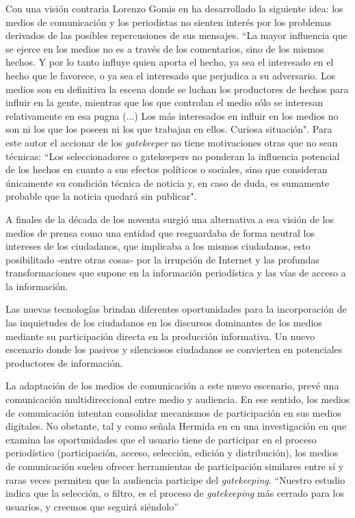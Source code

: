 Con una visión contraria Lorenzo Gomis en \cite{gomis1991teor} ha desarrollado la siguiente idea: los medios de comunicación y los periodistas no sienten interés por los problemas derivados de las posibles repercusiones de sus mensajes. ``La mayor influencia que se ejerce en los medios no es a través de los comentarios, sino de los mismos hechos. Y por lo tanto influye quien aporta el hecho, ya sea el interesado en el hecho que le favorece, o ya sea el interesado que perjudica a su adversario. Los medios son en definitiva la escena donde se luchan los productores de hechos para influir en la gente, mientras que los que controlan el medio sólo se interesan relativamente en esa pugna (...) Los más interesados en influir en los medios no son ni los que los poseen ni los que trabajan en ellos. Curiosa situación".
Para este autor el accionar de los \emph{gatekeeper} no tiene motivaciones otras que no sean técnicas: ``Los seleccionadores o gatekeepers no ponderan la influencia potencial de los hechos en cuanto a sus efectos políticos o sociales, sino que consideran únicamente su condición técnica de noticia y, en caso de duda, es sumamente probable que la noticia quedará sin publicar".

A finales de la década de los noventa surgió una alternativa a esa visión de los medios de prensa como una entidad que resguardaba de forma neutral los intereses de los ciudadanos, que implicaba a los mismos ciudadanos, esto posibilitado -entre otras cosas- por la irrupción de Internet y las profundas transformaciones que supone en la información periodística y las vías de acceso a la información.

Las nuevas tecnologías brindan diferentes oportunidades para la incorporación de las inquietudes de los ciudadanos en los discursos
dominantes de los medios mediante su participación directa en la producción informativa. Un nuevo escenario donde los pasivos y silenciosos ciudadanos se convierten en potenciales productores de información.

La adaptación de los medios de comunicación a este nuevo escenario, prevé una comunicación multidireccional entre medio y audiencia. En ese sentido, los medios de comunicación intentan consolidar mecanismos de participación en sus medios digitales. No obstante, tal y como señala Hermida en \cite{doi17512781003640703} en una investigación en que examina las oportunidades que el usuario tiene de participar en el proceso periodístico (participación, acceso, selección, edición y distribución), los medios de comunicación suelen ofrecer herramientas de participación similares entre sí y raras veces permiten que la audiencia participe del \emph{gatekeeping}. “Nuestro estudio indica que la selección, o filtro, es el proceso de \emph{gatekeeping} más cerrado para los usuarios, y creemos que seguirá siéndolo” \cite{doi17512781003640703}%

